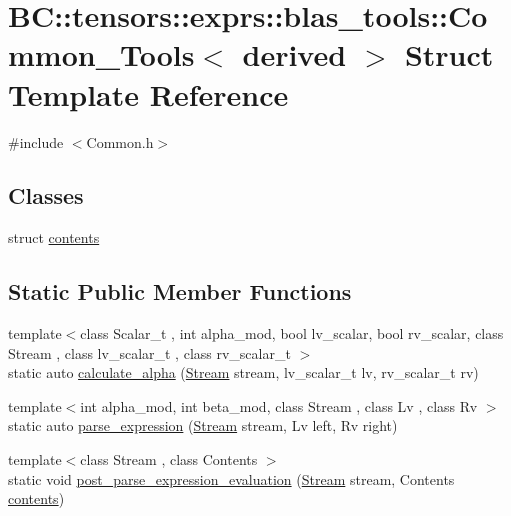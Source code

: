 \hypertarget{structBC_1_1tensors_1_1exprs_1_1blas__tools_1_1Common__Tools}{}\section{BC\+:\+:tensors\+:\+:exprs\+:\+:blas\+\_\+tools\+:\+:Common\+\_\+\+Tools$<$ derived $>$ Struct Template Reference}
\label{structBC_1_1tensors_1_1exprs_1_1blas__tools_1_1Common__Tools}


{\ttfamily \#include $<$Common.\+h$>$}

\subsection*{Classes}
\begin{DoxyCompactItemize}
\item 
struct \hyperlink{structBC_1_1tensors_1_1exprs_1_1blas__tools_1_1Common__Tools_1_1contents}{contents}
\end{DoxyCompactItemize}
\subsection*{Static Public Member Functions}
\begin{DoxyCompactItemize}
\item 
{\footnotesize template$<$class Scalar\+\_\+t , int alpha\+\_\+mod, bool lv\+\_\+scalar, bool rv\+\_\+scalar, class Stream , class lv\+\_\+scalar\+\_\+t , class rv\+\_\+scalar\+\_\+t $>$ }\\static auto \hyperlink{structBC_1_1tensors_1_1exprs_1_1blas__tools_1_1Common__Tools_a0311d8fbacefd38f74f2c7efc0d624ec}{calculate\+\_\+alpha} (\hyperlink{namespaceBC_abc64a63cd29a22d102a68f478dfd588d}{Stream} stream, lv\+\_\+scalar\+\_\+t lv, rv\+\_\+scalar\+\_\+t rv)
\item 
{\footnotesize template$<$int alpha\+\_\+mod, int beta\+\_\+mod, class Stream , class Lv , class Rv $>$ }\\static auto \hyperlink{structBC_1_1tensors_1_1exprs_1_1blas__tools_1_1Common__Tools_af64a4501aa20c6083c4f0aefcbed8129}{parse\+\_\+expression} (\hyperlink{namespaceBC_abc64a63cd29a22d102a68f478dfd588d}{Stream} stream, Lv left, Rv right)
\item 
{\footnotesize template$<$class Stream , class Contents $>$ }\\static void \hyperlink{structBC_1_1tensors_1_1exprs_1_1blas__tools_1_1Common__Tools_a9614d1b65c51b3e4cdd42ddc36f600a8}{post\+\_\+parse\+\_\+expression\+\_\+evaluation} (\hyperlink{namespaceBC_abc64a63cd29a22d102a68f478dfd588d}{Stream} stream, Contents \hyperlink{structBC_1_1tensors_1_1exprs_1_1blas__tools_1_1Common__Tools_1_1contents}{contents})
\end{DoxyCompactItemize}


